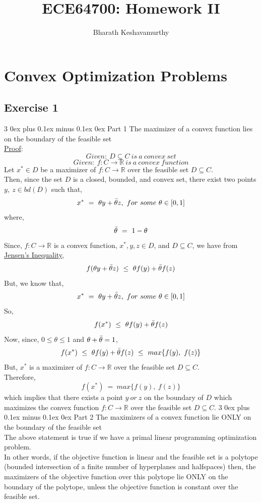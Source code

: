 \documentclass[12pt, draftcls, onecolumn]{IEEEtran}
\makeatletter
\def\subsubsection{\@startsection{subsubsection}%
                                 {3}%
                                 {\z@}%
                                 {0ex plus 0.1ex minus 0.1ex}%
                                 {0ex}%
                                 {\normalfont\normalsize\bfseries}}%
\makeatother
\begin{document}
 
\title{ECE64700: Homework II}
\author{Bharath Keshavamurthy}
\maketitle
\section*{Convex Optimization Problems}
\subsection{Exercise 1}
\subsubsection{Part 1}
The maximizer of a convex function lies on the boundary of the feasible set
\\\underline{Proof}:
\[Given:\ D \subseteq C\ is\ a\ convex\ set\]
\[Given:\ f:C \rightarrow \mathbb{R}\ is\ a\ convex\ function\]
Let $x^* \in D$ be a maximizer of $f:C \rightarrow \mathbb{R}$ over the feasible set $D \subseteq C$.
\\Then, since the set $D$ is a closed, bounded, and convex set, there exist two points $y,\ z \in bd(D)$ such that,
\[x^*\ =\ \theta y+\Bar{\theta} z,\ for\ some\ \theta \in [0,1]\]
where,
\[\Bar{\theta}\ =\ 1 - \theta\]
Since, $f:C \rightarrow \mathbb{R}$ is a convex function, $x^*, y, z \in D$, and $D \subseteq C$, we have from \underline{Jensen's Inequality},
\[f(\theta y+\Bar{\theta} z)\ \leq\ \theta f(y) + \Bar{\theta} f(z)\]
But, we know that,
\[x^*\ =\ \theta y+\Bar{\theta} z,\ for\ some\ \theta \in [0,1]\]
So,
\[f(x^*)\ \leq\ \theta f(y) + \Bar{\theta} f(z)\]
Now, since, $0 \leq \theta \leq 1$ and $\theta + \Bar{\theta} = 1$,
\[f(x^*)\ \leq\ \theta f(y) + \Bar{\theta} f(z)\ \leq\ max\{f(y),\ f(z)\}\]
But, $x^*$ is a maximizer of $f:C \rightarrow \mathbb{R}$ over the feasible set $D \subseteq C$.
\\Therefore,
\[f(x^*)\ =\ max\{f(y),\ f(z)\}\]
which implies that there exists a point $y\ or\ z$ on the boundary of $D$ which maximizes the convex function $f:C \rightarrow \mathbb{R}$ over the feasible set $D \subseteq C$.
\subsubsection{Part 2} The maximizers of a convex function lie ONLY on the boundary of the feasible set
\\The above statement is true if we have a primal linear programming optimization problem.
\\In other words, if the objective function is linear and the feasible set is a polytope (bounded intersection of a finite number of hyperplanes and halfspaces) then, the maximizers of the objective function over this polytope lie ONLY on the boundary of the polytope, unless the objective function is constant over the feasible set.
\end{document}
